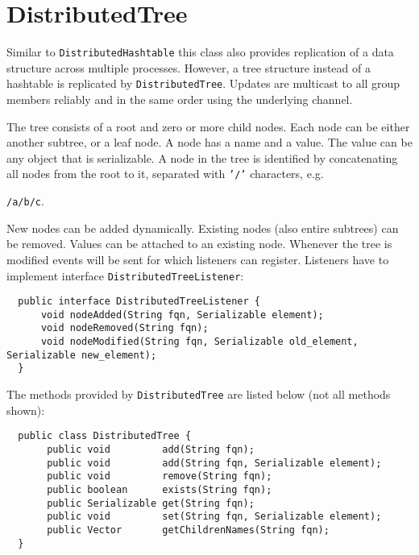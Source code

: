   \section{DistributedTree}

  Similar to {\tt DistributedHashtable} this class also provides replication of a
  data structure across multiple processes. However, a tree structure instead of a
  hashtable is replicated by {\tt DistributedTree}. Updates are multicast to all group
  members reliably and in the same order using the underlying channel.

  The tree consists of a root and zero or more child nodes. Each node can be either
  another subtree, or a leaf node. A node has a name and a value. The value can be
  any object that is serializable. A node in the tree is identified by concatenating
  all nodes from the root to it, separated with {\tt '/'} characters, e.g. 

  {\tt /a/b/c}.

  New nodes can be added dynamically. Existing nodes (also entire subtrees) can be
  removed. Values can be attached to an existing node. Whenever the tree is modified
  events will be sent for which listeners can register. Listeners have to implement
  interface {\tt DistributedTreeListener}:

  \begin{small}
  \begin{verbatim}
  public interface DistributedTreeListener {
      void nodeAdded(String fqn, Serializable element);
      void nodeRemoved(String fqn);
      void nodeModified(String fqn, Serializable old_element, Serializable new_element);
  }
  \end{verbatim}
  \end{small}

  The methods provided by {\tt DistributedTree} are listed below (not all methods
  shown):

  \begin{small}
  \begin{verbatim}
  public class DistributedTree {
       public void         add(String fqn);
       public void         add(String fqn, Serializable element);
       public void         remove(String fqn);
       public boolean      exists(String fqn);
       public Serializable get(String fqn);
       public void         set(String fqn, Serializable element);
       public Vector       getChildrenNames(String fqn);
  }
  \end{verbatim}
  \end{small}

